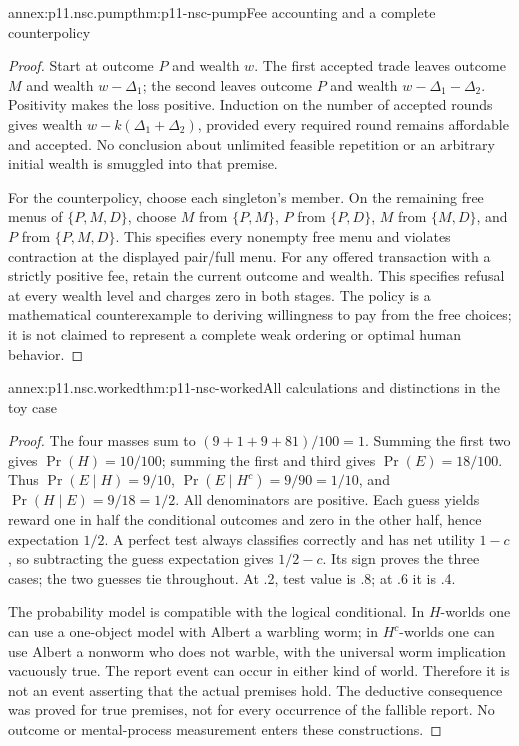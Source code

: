 \begin{annexitem}{annex:p11.nsc.pump}{thm:p11-nsc-pump}{Fee accounting and a complete counterpolicy}
\begin{proof}
Start at outcome \(P\) and wealth \(w\). The first accepted trade
leaves outcome \(M\) and wealth \(w-\Delta_1\); the second leaves
outcome \(P\) and wealth \(w-\Delta_1-\Delta_2\). Positivity makes
the loss positive. Induction on the number of accepted rounds gives
wealth \(w-k(\Delta_1+\Delta_2)\), provided every required round
remains affordable and accepted. No conclusion about unlimited feasible
repetition or an arbitrary initial wealth is smuggled into that premise.

For the counterpolicy, choose each singleton's member. On the remaining
free menus of \(\{P,M,D\}\), choose \(M\) from \(\{P,M\}\),
\(P\) from \(\{P,D\}\), \(M\) from \(\{M,D\}\), and
\(P\) from \(\{P,M,D\}\). This specifies every nonempty free
menu and violates contraction at the displayed pair/full menu. For any
offered transaction with a strictly positive fee, retain the current
outcome and wealth. This specifies refusal at every wealth level and
charges zero in both stages. The policy is a mathematical counterexample
to deriving willingness to pay from the free choices; it is not claimed
to represent a complete weak ordering or optimal human behavior.
\end{proof}
\end{annexitem}

\begin{annexitem}{annex:p11.nsc.worked}{thm:p11-nsc-worked}{All calculations and distinctions in the toy case}
\begin{proof}
The four masses sum to \((9+1+9+81)/100=1\).
Summing the first two gives \(\Pr(H)=10/100\); summing the first
and third gives \(\Pr(E)=18/100\). Thus
\(\Pr(E\mid H)=9/10\), \(\Pr(E\mid H^c)=9/90=1/10\),
and \(\Pr(H\mid E)=9/18=1/2\). All denominators are positive.
Each guess yields reward one in half the conditional outcomes and zero
in the other half, hence expectation \(1/2\). A perfect test always
classifies correctly and has net utility \(1-c\), so subtracting the
guess expectation gives \(1/2-c\). Its sign proves the three cases;
the two guesses tie throughout. At .2, test value is .8; at .6 it is .4.

The probability model is compatible with the logical conditional. In
\(H\)-worlds one can use a one-object model with Albert a warbling
worm; in \(H^c\)-worlds one can use Albert a nonworm who does not
warble, with the universal worm implication vacuously true. The report
event can occur in either kind of world. Therefore it is not an event
asserting that the actual premises hold. The deductive consequence was
proved for true premises, not for every occurrence of the fallible report.
No outcome or mental-process measurement enters these constructions.
\end{proof}
\end{annexitem}

